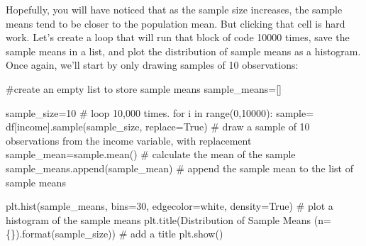 \documentclass[
  letterpaper,
  DIV=11,
  numbers=noendperiod]{scrreprt}
\newenvironment{Shaded}{\begin{snugshade}}{\end{snugshade}}
\newcommand{\BuiltInTok}[1]{\textcolor[rgb]{0.00,0.23,0.31}{#1}}
\newcommand{\CommentTok}[1]{\textcolor[rgb]{0.37,0.37,0.37}{#1}}
\newcommand{\ControlFlowTok}[1]{\textcolor[rgb]{0.00,0.23,0.31}{#1}}
\newcommand{\DecValTok}[1]{\textcolor[rgb]{0.68,0.00,0.00}{#1}}
\newcommand{\KeywordTok}[1]{\textcolor[rgb]{0.00,0.23,0.31}{#1}}
\newcommand{\NormalTok}[1]{\textcolor[rgb]{0.00,0.23,0.31}{#1}}
\newcommand{\OperatorTok}[1]{\textcolor[rgb]{0.37,0.37,0.37}{#1}}
\newcommand{\SpecialCharTok}[1]{\textcolor[rgb]{0.37,0.37,0.37}{#1}}
\newcommand{\StringTok}[1]{\textcolor[rgb]{0.13,0.47,0.30}{#1}}
\newcommand{\VariableTok}[1]{\textcolor[rgb]{0.07,0.07,0.07}{#1}}
\begin{document}
Hopefully, you will have noticed that as the sample size increases, the
sample means tend to be closer to the population mean. But clicking that
cell is hard work. Let's create a loop that will run that block of code
10000 times, save the sample means in a list, and plot the distribution
of sample means as a histogram. Once again, we'll start by only drawing
samples of 10 observations:

\begin{Shaded}
\begin{Highlighting}[]
\CommentTok{\#create an empty list to store sample means}
\NormalTok{sample\_means}\OperatorTok{=}\NormalTok{[]}

\NormalTok{sample\_size}\OperatorTok{=}\DecValTok{10}
\CommentTok{\# loop 10,000 times.}
\ControlFlowTok{for}\NormalTok{ i }\KeywordTok{in} \BuiltInTok{range}\NormalTok{(}\DecValTok{0}\NormalTok{,}\DecValTok{10000}\NormalTok{):}
\NormalTok{    sample}\OperatorTok{=}\NormalTok{ df[}\StringTok{\textquotesingle{}income\textquotesingle{}}\NormalTok{].sample(sample\_size, replace}\OperatorTok{=}\VariableTok{True}\NormalTok{) }\CommentTok{\# draw a sample of 10 observations from the income variable, with replacement}
\NormalTok{    sample\_mean}\OperatorTok{=}\NormalTok{sample.mean() }\CommentTok{\# calculate the mean of the sample}
\NormalTok{    sample\_means.append(sample\_mean) }\CommentTok{\# append the sample mean to the list of sample means}
    
\NormalTok{plt.hist(sample\_means, bins}\OperatorTok{=}\DecValTok{30}\NormalTok{, edgecolor}\OperatorTok{=}\StringTok{\textquotesingle{}white\textquotesingle{}}\NormalTok{, density}\OperatorTok{=}\VariableTok{True}\NormalTok{) }\CommentTok{\# plot a histogram of the sample means}
\NormalTok{plt.title(}\StringTok{\textquotesingle{}Distribution of Sample Means (n=}\SpecialCharTok{\{\}}\StringTok{)\textquotesingle{}}\NormalTok{.}\BuiltInTok{format}\NormalTok{(sample\_size)) }\CommentTok{\# add a title}
\NormalTok{plt.show()}
\end{Highlighting}
\end{Shaded}
\end{document}

